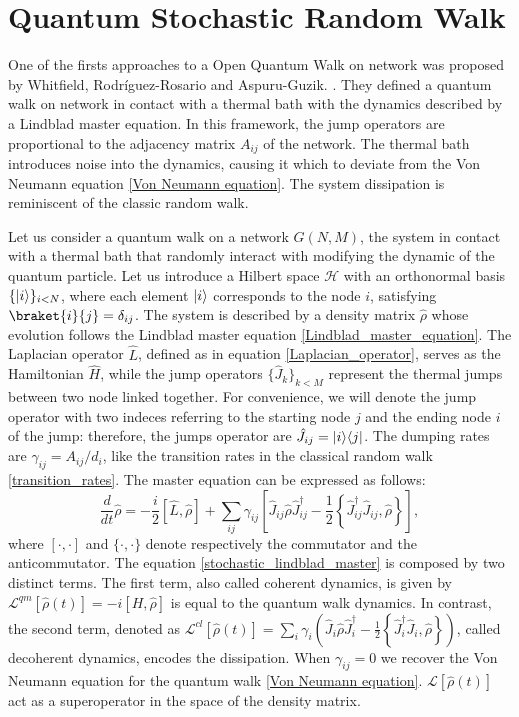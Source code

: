 \section{Quantum Stochastic Random Walk}\label{C_Quantum Stochastic Walk}

One of the firsts approaches to a Open Quantum Walk on network was proposed by Whitfield, Rodr\'iguez-Rosario and Aspuru-Guzik. \cite{QSW}. They defined a quantum walk on network in contact with a thermal bath with the dynamics described by a Lindblad master equation. In this framework, the jump operators are proportional to the adjacency  matrix $A_{ij}$ of the network. The thermal bath introduces noise into the dynamics, causing it which to deviate from the  Von Neumann equation \eqref{Von Neumann equation}. The system dissipation is reminiscent of the classic random walk.

Let us consider a quantum walk on a network $G(N,M)$, the system in contact with a thermal bath that randomly interact with modifying the dynamic of the quantum particle.
Let us introduce a Hilbert space $\mathcal{H}$ with an orthonormal basis $\{\lvert i\rangle\}_{i<N}$, where each element $\lvert i\rangle$ corresponds to the node $i$, satisfying $\braket{i}{j}=\delta_{ij}$. The system is described by a density matrix $\hat \rho$ whose evolution follows the Lindblad master equation \eqref{Lindblad_master_equation}.
The Laplacian operator $\hat L$, defined as in equation \eqref{Laplacian_operator}, serves as the Hamiltonian $\hat H$, while the jump operators $\{\hat J_k\}_{k<M}$ represent the thermal jumps between two node linked together. For convenience, we will denote the jump operator with two indeces referring to the starting node $j$ and the ending node $i$ of the jump: therefore, the jumps operator are $\hat J_{ij} = \lvert i\rangle\langle j\rvert$. The dumping rates are $\gamma_{ij} =A_{ij}/d_i$, like the transition rates in the classical random walk \eqref{transition_rates}.
The master equation can be expressed as follows:
\begin{equation}\label{stochastic_lindblad_master}
    \frac{d}{dt}\hat \rho = -\frac{i}{2}\left[\hat L,\hat\rho\right] + \sum_{ij}\gamma_{ij}\left[\hat J_{ij} \hat\rho\hat J_{ij}^\dagger -\frac{1}{2} \left\{ \hat J_{ij}^\dagger \hat J_{ij}, \hat\rho\right\}\right],
\end{equation}
where $[\cdot,\cdot]$ and $\{\cdot,\cdot\}$ denote respectively the commutator and the anticommutator.
The equation \eqref{stochastic_lindblad_master} is composed by two distinct terms. The first term, also called coherent dynamics,  is given by
$\mathcal{L}^{qm}\left[\hat\rho(t)\right] = -i\left[H,\hat\rho\right]$ is equal to the quantum walk dynamics. In contrast, the second term, denoted as $\mathcal{L}^{cl}\left[\hat\rho(t)\right] = \sum_i \gamma_i \left(\hat J_i \hat\rho \hat J^\dagger_i - \frac{1}{2}\left\{ \hat J^\dagger_i\hat J_i, \hat\rho\right\} \right)$, called decoherent dynamics, encodes the dissipation. 
When $\gamma_{ij} = 0$ we recover the Von Neumann equation for the quantum walk \eqref{Von Neumann equation}. 
$\mathcal{L}\left[\hat\rho(t)\right]$ act as a superoperator in the space of the density matrix.


